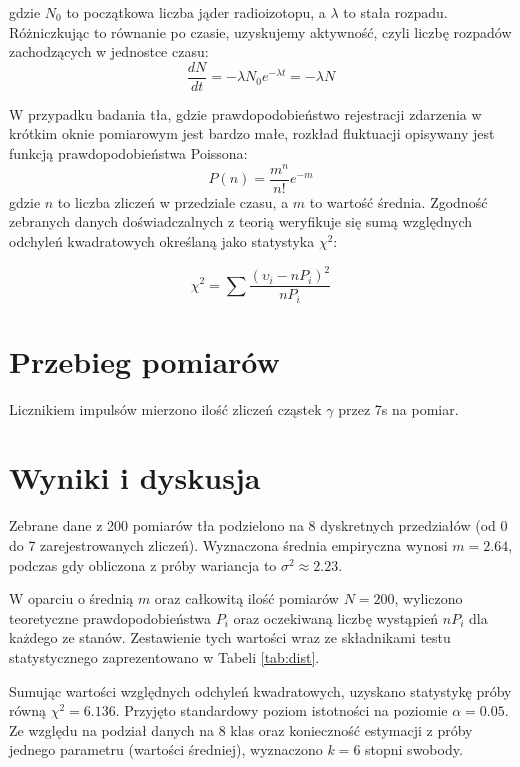 \documentclass[a4paper,12pt]{article} %
\begin{document}
gdzie $N_0$ to początkowa liczba jąder radioizotopu,
a $\lambda$ to stała rozpadu.
Różniczkując to równanie po czasie, uzyskujemy aktywność,
czyli liczbę rozpadów zachodzących w jednostce czasu:
\begin{equation}
\frac{dN}{dt} = -\lambda N_0 e^{-\lambda t} = -\lambda N
\end{equation}

W przypadku badania tła, gdzie prawdopodobieństwo rejestracji zdarzenia w krótkim oknie pomiarowym jest bardzo małe, 
rozkład fluktuacji opisywany jest funkcją prawdopodobieństwa Poissona\cite{erroranal}:
\begin{equation}
P(n) = \frac{m^n}{n!} e^{-m}
\end{equation}
gdzie $n$ to liczba zliczeń w przedziale czasu, a $m$ to wartość średnia. 
Zgodność zebranych danych doświadczalnych z teorią weryfikuje się sumą względnych odchyleń kwadratowych określaną jako statystyka $\chi^2$:

\begin{equation}
\chi^2 = \sum \frac{(\upsilon_i - nP_i)^2}{nP_i}
\end{equation}

\section{Przebieg pomiarów}
Licznikiem impulsów mierzono ilość zliczeń cząstek $\gamma$
przez 7s na pomiar. 

\section{Wyniki i dyskusja}
Zebrane dane z 200 pomiarów tła podzielono na
8 dyskretnych przedziałów (od 0 do 7 zarejestrowanych zliczeń).
Wyznaczona średnia empiryczna wynosi $m = 2.64$, podczas gdy obliczona z próby wariancja to $\sigma^2 \approx 2.23$.

W oparciu o średnią $m$ oraz całkowitą ilość pomiarów $N = 200$,
wyliczono teoretyczne prawdopodobieństwa $P_i$ 
oraz oczekiwaną liczbę wystąpień $nP_i$ dla każdego ze stanów.
Zestawienie tych wartości wraz ze składnikami testu statystycznego
zaprezentowano w Tabeli \ref{tab:dist}.

\begin{table}[H]
  \centering
  \caption{Zestawienie wyników pomiarów i obliczeń dla rozkładu Poissona}
  \label{tab:dist}
  
\end{table}

Sumując wartości względnych odchyleń kwadratowych,
uzyskano statystykę próby równą $\chi^2 = 6.136$.
Przyjęto standardowy poziom istotności na poziomie $\alpha = 0.05$.
Ze względu na podział danych na 8 klas 
oraz konieczność estymacji z próby jednego parametru
(wartości średniej), wyznaczono $k = 6$ stopni swobody. 
\end{document}
